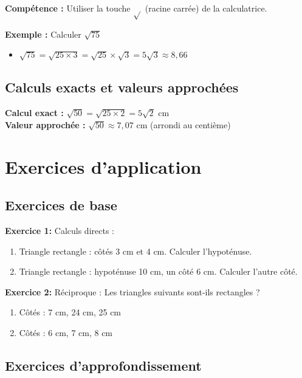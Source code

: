 \textbf{Compétence :} Utiliser la touche $\sqrt{}$ (racine carrée) de la calculatrice.

\textbf{Exemple :} Calculer $\sqrt{75}$
\begin{itemize}
    \item $\sqrt{75} = \sqrt{25 \times 3} = \sqrt{25} \times \sqrt{3} = 5\sqrt{3} \approx 8,66$
\end{itemize}

\subsection{Calculs exacts et valeurs approchées}

\textbf{Calcul exact :} $\sqrt{50} = \sqrt{25 \times 2} = 5\sqrt{2}$ cm\\
\textbf{Valeur approchée :} $\sqrt{50} \approx 7,07$ cm (arrondi au centième)



\section{Exercices d'application}

\subsection{Exercices de base}

\begin{exercisebox}
\textbf{Exercice 1:} Calculs directs :
\begin{enumerate}[label=\alph*)]
    \item Triangle rectangle : côtés 3 cm et 4 cm. Calculer l'hypoténuse.
    \item Triangle rectangle : hypoténuse 10 cm, un côté 6 cm. Calculer l'autre côté.
\end{enumerate}

\textbf{Exercice 2:}
Réciproque : Les triangles suivants sont-ils rectangles ?
\begin{enumerate}[label=\alph*)]
	\item Côtés : 7 cm, 24 cm, 25 cm
	\item Côtés : 6 cm, 7 cm, 8 cm
\end{enumerate}
\end{exercisebox}

\subsection{Exercices d'approfondissement}


